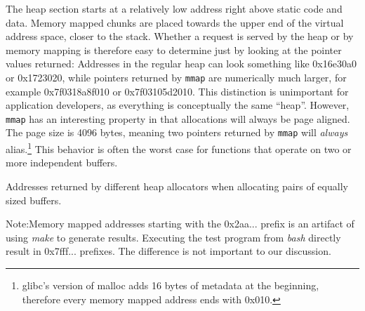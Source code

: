\documentclass{acm_proc_article-sp}
\begin{document}
The heap section starts at a relatively low address right above static code and data.
Memory mapped chunks are placed towards the upper end of the virtual address space, closer to the stack.
Whether a request is served by the heap or by memory mapping is therefore easy to determine just by looking at the pointer values returned:
Addresses in the regular heap can look something like 0x16e30a0 or 0x1723020, while pointers returned by \texttt{mmap} are numerically much larger, for example 0x7f0318a8f010 or 0x7f03105d2010.
This distinction is unimportant for application developers, as everything is conceptually the same ``heap''.
However, \texttt{mmap} has an interesting property in that allocations will always be page aligned.
The page size is 4096 bytes, meaning two pointers returned by \texttt{mmap} will \emph{always} alias.\footnote{glibc's version of malloc adds 16 bytes of metadata at the beginning, therefore every memory mapped address ends with 0x010.}
This behavior is often the worst case for functions that operate on two or more independent buffers.

\begin{table}[t]
  \caption{Addresses returned by different heap allocators when allocating pairs of equally sized buffers.\label{tab:mallocompare}}{
  }
{Note:}{Memory mapped addresses starting with the 0x2aa... prefix is an artifact of using \emph{make} to generate results. Executing the test program from \emph{bash} directly result in 0x7fff... prefixes.
    The difference is not important to our discussion.}
\end{table}
\end{document}
